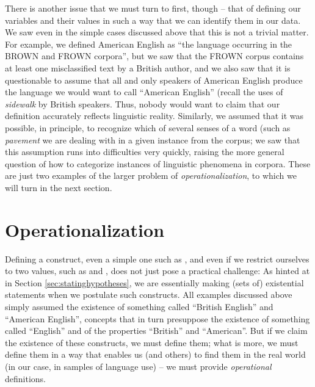 There is another issue that we must turn to first, though -- that of defining our variables and their values in such a way that we can identify them in our data. We saw even in the simple cases discussed above that this is not a trivial matter. For example, we defined American English as ``the language occurring in the BROWN and FROWN corpora'', but we saw that the FROWN corpus contains at least one misclassified text by a British author, and we also saw that it is questionable to assume that all and only speakers of American English produce the language we would want to call ``American English'' (recall the uses of \textit{sidewalk} by British speakers. Thus, nobody would want to claim that our definition accurately reflects linguistic reality. Similarly, we assumed that it was possible, in principle, to recognize which of several senses of a word (such as \textit{pavement} we are dealing with in a given instance from the corpus; we saw that this assumption runs into difficulties very quickly, raising the more general question of how to categorize instances of linguistic phenomena in corpora. These are just two examples of the larger problem of \textit{operationalization}, to which we will turn in the next section.

\section{Operationalization}
\label{sec:operationalization}

Defining a construct, even a simple one such as , and even if we restrict ourselves to two values, such as  and , does not just pose a practical challenge: As hinted at in Section \ref{sec:statinghypotheses}, we are essentially making (sets of) existential statements when we postulate such constructs. All examples discussed above simply assumed the existence of something called ``British English'' and ``American English'', concepts that in turn presuppose the existence of something called ``English'' and of the properties ``British'' and ``American''. But if we claim the existence of these constructs, we must define them; what is more, we must define them in a way that enables us (and others) to find them in the real world (in our case, in samples of language use) -- we must provide \emph{operational} definitions.


